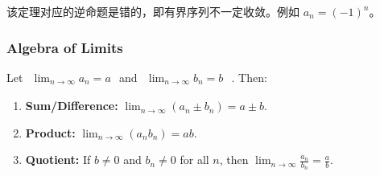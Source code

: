 \documentclass[
	UTF-8,
	11pt, %
	a4paper, %
]{LegrandOrangeBook}
\begin{document}
    \begin{remark}
    该定理对应的逆命题是错的，即有界序列不一定收敛。例如 $a_n = (-1)^n$。
    \end{remark}

    \newpage

    \subsubsection{Algebra of Limits}

    \begin{theorem}
    Let 
    $\begin{aligned}
        \lim_{n \to \infty} a_n = a
    \end{aligned}$
    and 
    $\begin{aligned}
        \lim_{n \to \infty} b_n = b
    \end{aligned}$
    . Then:
    \begin{enumerate}
        \item \textbf{Sum/Difference:} $\lim_{n \to \infty} (a_n \pm b_n) = a \pm b$.
        \item \textbf{Product:} $\lim_{n \to \infty} (a_n b_n) = ab$.
        \item \textbf{Quotient:} If $b \ne 0$ and $b_n \ne 0$ for all $n$, then $\lim_{n \to \infty} \frac{a_n}{b_n} = \frac{a}{b}$.
    \end{enumerate}
    \end{theorem}
\end{document}
